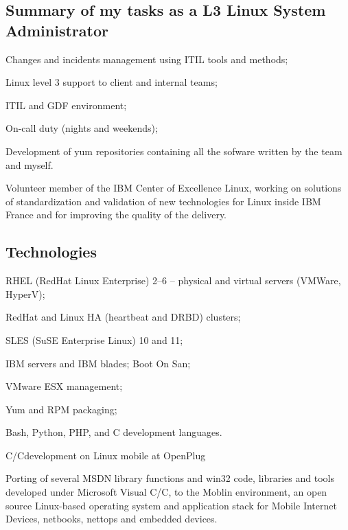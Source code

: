 \subsection{Summary of my tasks as a L3 Linux System Administrator}

\item{\bdot} Changes and incidents management using ITIL tools and methods;
\item{\bdot} Linux level 3 support to client and internal teams;
\item{\bdot} ITIL and GDF environment;
\item{\bdot} On-call duty (nights and weekends);
\item{\bdot} Development of yum repositories containing all the sofware 
   written by the team and myself.

\smallskip\noindent
Volunteer member of the IBM Center of Excellence Linux, working on solutions of 
standardization and validation of new technologies for Linux inside IBM France and
for improving the quality of the delivery.

\subsection{Technologies}

\item{\bdot} RHEL (RedHat Linux Enterprise) 2--6 -- physical and virtual 
   servers (VMWare, HyperV);
\item{\bdot} RedHat and Linux HA (heartbeat and DRBD) clusters;
\item{\bdot} SLES (SuSE Enterprise Linux) 10 and 11;
\item{\bdot} IBM servers and IBM blades; Boot On San;
\item{\bdot} VMware ESX management;
\item{\bdot} Yum and RPM packaging;
\item{\bdot} Bash, Python, PHP, and C development languages.


\bigskip
{}
   {C/C\plusplus development on Linux mobile at OpenPlug}

\noindent
Porting of several MSDN library functions and win32 code, libraries and tools
developed under Microsoft Visual C/C\plusplus, to the Moblin environment,
an open source Linux-based operating system and application stack for
Mobile Internet Devices, netbooks, nettops and embedded devices.

